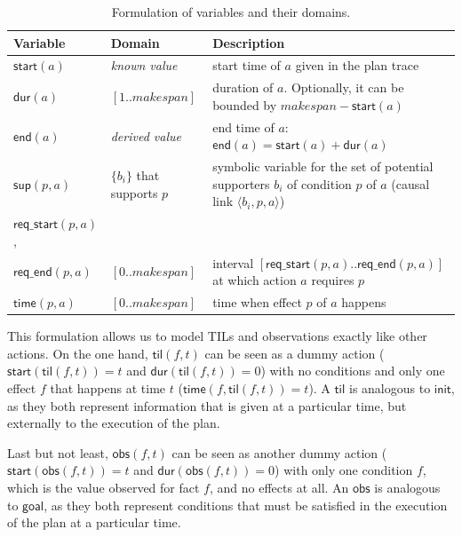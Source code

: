 \documentclass[runningheads]{llncs}
\newcommand{\tup}[1]{{\langle #1 \rangle}}
\newcommand{\dur}{\mathsf{dur}}    %
\newcommand{\obs}{\mathsf{obs}}    %
\newcommand{\start}{\mathsf{start}}%
\newcommand{\en}{\mathsf{end}}     %
\newcommand{\til}{\mathsf{til}}    %
\newcommand{\supp}{\mathsf{sup}}   %
\newcommand{\tim}{\mathsf{time}}   %
\newcommand{\reqs}{\mathsf{req\_{start}}} %
\newcommand{\reqe}{\mathsf{req\_{end}}}   %
\newcommand{\ini}{\mathsf{init}}   %
\newcommand{\goal}{\mathsf{goal}}  %
\begin{document}
\begin{table}
\begin{center}
\small
\begin{tabular}{p{2cm}p{2.7cm}p{7.4cm}}
\textbf{Variable} & \textbf{Domain} & \textbf{Description} \\

\hline


$\start(a)$ & \emph{known value} & start time of $a$ given in the plan trace \\
$\dur(a)$ & $[1..makespan]$ & duration of $a$. Optionally, it can be bounded by $makespan-\start(a)$\\
$\en(a)$ & \emph{derived value} & end time of $a$: $\en(a)=\start(a)+\dur(a)$ \\


$\supp(p,a)$ & $\{b_i\}$ that \newline supports $p$ & symbolic variable for the set of potential supporters $b_i$ of condition $p$ of $a$ (causal link $\tup{b_i,p,a}$) \\

$\reqs(p,a)$, \\
$\reqe(p,a)$ & $[0..makespan]$ & interval $[\reqs(p,a)..\reqe(p,a)]$ at which action $a$ requires $p$ \\

$\tim(p,a)$ & $[0..makespan]$ & time when effect $p$ of $a$ happens \\


\hline
\end{tabular}
\normalsize
\end{center}
\caption{Formulation of variables and their domains.}
\label{table:variables}
\end{table}

This formulation allows us to model TILs and observations exactly like other actions. On the one hand, $\til(f,t)$ can be seen as a dummy action ($\start(\til(f,t))=t$ and $\dur(\til(f,t))=0$) with no conditions and only one effect $f$ that happens at time $t$ ($\tim(f,\til(f,t))=t$). A $\til$ is analogous to $\ini$, as they both represent information that is given at a particular time, but externally to the execution of the plan.

Last but not least, $\obs(f,t)$ can be seen as another dummy action ($\start(\obs(f,t))=t$ and $\dur(\obs(f,t))=0$) with only one condition $f$, which is the value observed for fact $f$, and no effects at all. An $\obs$ is analogous to $\goal$, as they both represent conditions that must be satisfied in the execution of the plan at a particular time.
\end{document}
